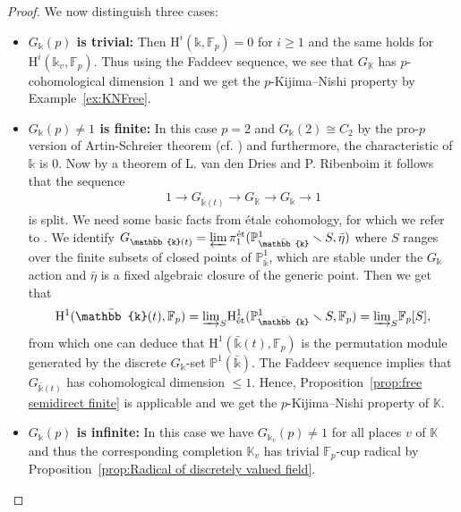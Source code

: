 \documentclass{amsart}
\theoremstyle{definition}
\theoremstyle{remark}
\newcommand{\KK}{\mathbb{K}}
\newcommand{\FF}{\mathbb{F}}
\newcommand{\rmH}{\mathrm H}%
\begin{document}
\begin{proof}
    We now distinguish three cases:
    \begin{itemize}[leftmargin=.5cm]
        \item \textbf{$G_\mathbb{k}(p)$ is trivial:} Then $\rmH^i(\mathbb{k},\FF_p)=0$ for $i\geq 1$ and the same holds for $\rmH^i(\mathbb{k}_v,\FF_p)$. Thus using the Faddeev sequence, we see that $G_\KK$ has $p$-cohomological dimension $1$ and we get the $p$-Kijima--Nishi property by Example~\ref{ex:KNFree}. 
        \item \textbf{$G_\mathbb{k}(p)\neq 1$ is finite:} In this case $p=2$ and $G_{\mathbb{k}}(2)\cong C_2$ by the pro-$p$ version of Artin-Schreier theorem (cf. \cite{Becker:ASp}) and furthermore, the characteristic of $\mathbb{k}$ is $0$. Now by a theorem of L. van den Dries and P. Ribenboim \cite{DriesRibenboim1984} it follows that the sequence
        \begin{align*}
            1\longrightarrow G_{\bar{\mathbb{k}}(t)}\longrightarrow G_{\KK}\longrightarrow G_{\mathbb{k}}\longrightarrow 1
        \end{align*}
        is split. We need some basic facts from étale cohomology, for which we refer to \cite{Milne1980}. We identify $G_{\bar{\mathbb{k}}(t)}=\varprojlim \pi_1^{\rm \acute{e}t}(\mathbb{P}^1_{\bar{\mathbb{k}}}\smallsetminus S,\bar\eta)$
        where $S$ ranges over the finite subsets of closed points of $\mathbb{P}^1_{\bar{\mathbb{k}}}$, which are stable under the $G_{\mathbb{k}}$ action and $\bar\eta$ is a fixed algebraic closure of the generic point. Then we get that
        \begin{align*}
            \rmH^1(\bar{\mathbb{k}} (t),\FF_p)={\varinjlim}_{S} \rmH^1_{\rm \acute{e}t}(\mathbb{P}^1_{\bar{\mathbb{k}}}\smallsetminus S,\FF_p)={\varinjlim}_{S} \FF_p[S],
        \end{align*}
        from which one can deduce that $\rmH^1(\bar{\mathbb{k}}(t),\FF_p)$ is the permutation module generated by the discrete $G_{\mathbb{k}}$-set $\mathbb{P}^1(\bar{\mathbb{k}})$. The Faddeev sequence implies that $G_{\bar{\mathbb{k}}(t)}$ has cohomological dimension $\leq 1$. Hence, Proposition~\ref{prop:free semidirect finite} is applicable and we get the $p$-Kijima--Nishi property of $\KK$.
        \item \textbf{$G_\mathbb{k}(p)$ is infinite:} In this case we have $G_{\mathbb{k}_v}(p)\neq 1$ for all places $v$ of $\KK$ and thus the corresponding completion $\KK_v$ has trivial $\FF_p$-cup  radical by Proposition~\ref{prop:Radical of discretely valued field}. 
    

\end{itemize}
\end{proof}
\end{document}
